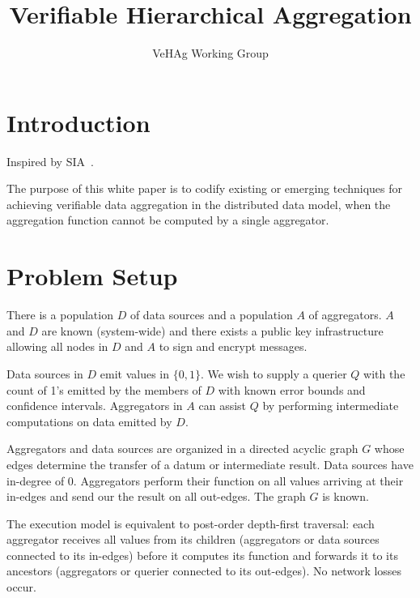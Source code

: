 \documentclass[11pt,twocolumn]{MyTightStyle}
\theoremstyle{plain}
\theoremstyle{definition}
\theoremstyle{remark}
\numberwithin{equation}{section}
\begin{document}
\title{Verifiable Hierarchical Aggregation}

\author{
VeHAg Working Group
}

\maketitle

\begin{abstract}
\end{abstract}


\section{Introduction}
\label{sec:introduction}

Inspired by SIA~\cite{Przydatek2003}.

The purpose of this white paper is to codify existing or emerging
techniques for achieving verifiable data aggregation in the distributed
data model, when the aggregation function cannot be computed by a single
aggregator.



\section{Problem Setup}

There is a population $D$ of data sources and a population $A$ of
aggregators.  $A$ and $D$ are known (system-wide) and there exists a
public key infrastructure allowing all nodes in $D$ and $A$ to sign and
encrypt messages.

Data sources in $D$ emit values in $\{0, 1\}$.  We wish to supply a
querier $Q$ with the count of 1's emitted by the members of $D$ with
known error bounds and confidence intervals.
Aggregators in $A$ can assist $Q$ by performing intermediate
computations on data emitted by $D$.

Aggregators and data sources are organized in a directed acyclic graph
$G$ whose edges determine the transfer of a datum or intermediate
result.  Data sources have in-degree of 0.  Aggregators perform their
function on all values arriving at their in-edges and send our the
result on all out-edges.  The graph $G$ is known.

The execution model is equivalent to post-order depth-first traversal:
each aggregator receives all values from its children (aggregators or
data sources connected to its in-edges) before it computes its function
and forwards it to its ancestors (aggregators or querier connected to
its out-edges).  No network losses occur.
\end{document}
